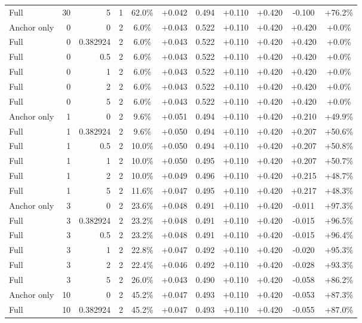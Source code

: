 \begin{table}[htbp]
\begin{tabular}{lrrrccccccc}
Full & 30 & 5 & 1 & 62.0\% & +0.042 & 0.494 & +0.110 & +0.420 & -0.100 & +76.2\% \\
Anchor only & 0 & 0 & 2 & 6.0\% & +0.043 & 0.522 & +0.110 & +0.420 & +0.420 & +0.0\% \\
Full & 0 & 0.382924 & 2 & 6.0\% & +0.043 & 0.522 & +0.110 & +0.420 & +0.420 & +0.0\% \\
Full & 0 & 0.5 & 2 & 6.0\% & +0.043 & 0.522 & +0.110 & +0.420 & +0.420 & +0.0\% \\
Full & 0 & 1 & 2 & 6.0\% & +0.043 & 0.522 & +0.110 & +0.420 & +0.420 & +0.0\% \\
Full & 0 & 2 & 2 & 6.0\% & +0.043 & 0.522 & +0.110 & +0.420 & +0.420 & +0.0\% \\
Full & 0 & 5 & 2 & 6.0\% & +0.043 & 0.522 & +0.110 & +0.420 & +0.420 & +0.0\% \\
Anchor only & 1 & 0 & 2 & 9.6\% & +0.051 & 0.494 & +0.110 & +0.420 & +0.210 & +49.9\% \\
Full & 1 & 0.382924 & 2 & 9.6\% & +0.050 & 0.494 & +0.110 & +0.420 & +0.207 & +50.6\% \\
Full & 1 & 0.5 & 2 & 10.0\% & +0.050 & 0.494 & +0.110 & +0.420 & +0.207 & +50.8\% \\
Full & 1 & 1 & 2 & 10.0\% & +0.050 & 0.495 & +0.110 & +0.420 & +0.207 & +50.7\% \\
Full & 1 & 2 & 2 & 10.0\% & +0.049 & 0.496 & +0.110 & +0.420 & +0.215 & +48.7\% \\
Full & 1 & 5 & 2 & 11.6\% & +0.047 & 0.495 & +0.110 & +0.420 & +0.217 & +48.3\% \\
Anchor only & 3 & 0 & 2 & 23.6\% & +0.048 & 0.491 & +0.110 & +0.420 & -0.011 & +97.3\% \\
Full & 3 & 0.382924 & 2 & 23.2\% & +0.048 & 0.491 & +0.110 & +0.420 & -0.015 & +96.5\% \\
Full & 3 & 0.5 & 2 & 23.2\% & +0.048 & 0.491 & +0.110 & +0.420 & -0.015 & +96.4\% \\
Full & 3 & 1 & 2 & 22.8\% & +0.047 & 0.492 & +0.110 & +0.420 & -0.020 & +95.3\% \\
Full & 3 & 2 & 2 & 22.4\% & +0.046 & 0.492 & +0.110 & +0.420 & -0.028 & +93.3\% \\
Full & 3 & 5 & 2 & 26.0\% & +0.043 & 0.490 & +0.110 & +0.420 & -0.058 & +86.2\% \\
Anchor only & 10 & 0 & 2 & 45.2\% & +0.047 & 0.493 & +0.110 & +0.420 & -0.053 & +87.3\% \\
Full & 10 & 0.382924 & 2 & 45.2\% & +0.047 & 0.493 & +0.110 & +0.420 & -0.055 & +87.0\% \\

\end{tabular}
\end{table}
